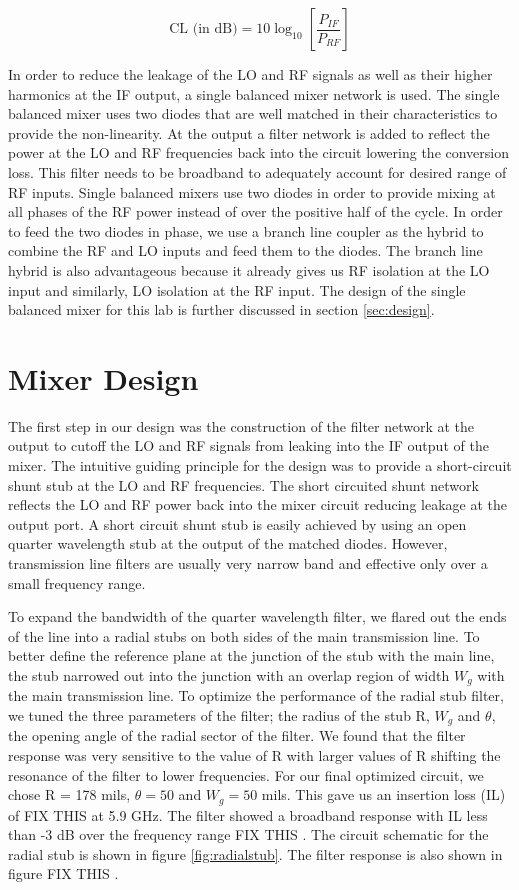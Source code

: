 \documentclass[twocolumn, aps, floatfix]{revtex4-1}
\begin{document}
\begin{equation}
    \textrm{CL (in dB)} = 10 \log_{10} \left[\frac{P_{IF}}{P_{RF}}\right]
\end{equation}

In order to reduce the leakage of the LO and RF signals as well as their higher harmonics at the IF output, a single balanced mixer network is used. The single balanced mixer uses two diodes that are well matched in their characteristics to provide the non-linearity. At the output a filter network is added to reflect the power at the LO and RF frequencies back into the circuit lowering the conversion loss. This filter needs to be broadband to adequately account for desired range of RF inputs. Single balanced mixers use two diodes in order to provide mixing at all phases of the RF power instead of over the positive half of the cycle. In order to feed the two diodes in phase, we use a branch line coupler as the hybrid to combine the RF and LO inputs and feed them to the diodes. The branch line hybrid is also advantageous because it already gives us RF isolation at the LO input and similarly, LO isolation at the RF input. The design of the single balanced mixer for this lab is further discussed in section \ref{sec:design}.


\section*{Mixer Design}\label{sec:design}

The first step in our design was the construction of the filter network at the output to cutoff the LO and RF signals from leaking into the IF output of the mixer. The intuitive guiding principle for the design was to provide a short-circuit shunt stub at the LO and RF frequencies. The short circuited shunt network reflects the LO and RF power back into the mixer circuit reducing leakage at the output port. A short circuit shunt stub is easily achieved by using an open quarter wavelength stub at the output of the matched diodes. However, transmission line filters are usually very narrow band and effective only over a small frequency range. 

To expand the bandwidth of the quarter wavelength filter, we flared out the ends of the line into a radial stubs on both sides of the main transmission line. To better define the reference plane at the junction of the stub with the main line, the stub narrowed out into the junction with an overlap region of width $W_g$ with the main transmission line. To optimize the performance of the radial stub filter, we tuned the three parameters of the filter; the radius of the stub R, $W_g$ and $\theta$, the opening angle of the radial sector of the filter. We found that the filter response was very sensitive to the value of R with larger values of R shifting the resonance of the filter to lower frequencies. For our final optimized circuit, we chose R = 178 mils, $\theta = 50$ \textdegree and $W_g = 50$ mils. This gave us an insertion loss (IL) of FIX THIS  at 5.9 GHz. The filter showed a broadband response with IL less than -3 dB over the frequency range FIX THIS . The circuit schematic for the radial stub is shown in figure \ref{fig:radialstub}. The filter response is also shown in figure FIX THIS .
\end{document}
